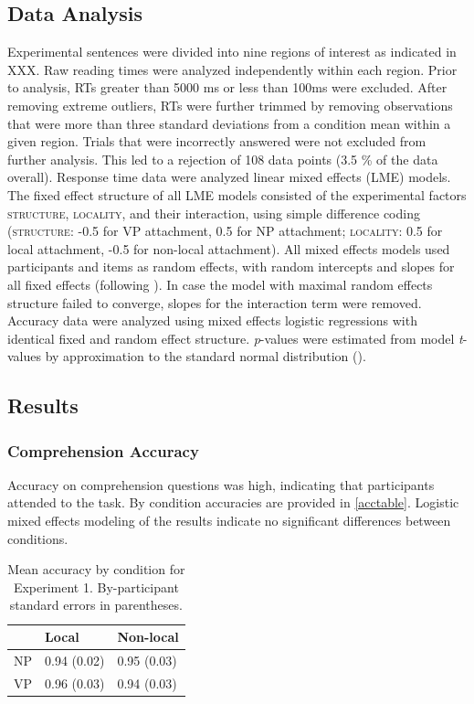 \documentclass[12pt]{article}
\begin{document}
\subsection{Data Analysis}
\label{sec:procedure}

Experimental sentences were divided into nine regions of interest as indicated in XXX. Raw reading times were analyzed independently within each region. Prior to analysis, RTs greater than 5000 ms or less than 100ms were excluded. After removing extreme outliers, RTs were further trimmed by removing observations that were more than three standard deviations from a condition mean within a given region. Trials that were incorrectly answered were not excluded from further analysis. This led to a rejection of 108 data points (3.5 \% of the data overall). Response time data were analyzed linear mixed effects (LME) models. The fixed effect structure of all LME models consisted of the experimental factors \textsc{structure}, \textsc{locality}, and their interaction, using simple difference coding (\textsc{structure}: -0.5 for VP attachment,  0.5 for NP attachment;  \textsc{locality}: 0.5 for local attachment, -0.5 for non-local attachment). All mixed effects models used participants and items as random effects, with random intercepts and slopes for all fixed effects (following \cite{barr2013}). In case the model with maximal random effects structure failed to converge, slopes for the interaction term were removed. Accuracy data were analyzed using mixed effects logistic regressions with identical fixed and random effect structure. \textit{p}-values were estimated from model \textit{t}-values by approximation to the standard normal distribution (\cite{baayen2008}).   
  
\subsection{Results}
\label{sec:results}

\subsubsection{Comprehension Accuracy}
\label{sec:acc}

Accuracy on comprehension questions was high, indicating that participants attended to the task. By condition accuracies are provided in \ref{acctable}. Logistic mixed effects modeling of the results indicate no significant differences between conditions. 

\begin{table}[ht]
\begin{center}
\begin{tabular}{rll}
  \hline
 & Local & Non-local \\ 
  \hline
NP & 0.94 (0.02) & 0.95 (0.03) \\ 
  VP & 0.96 (0.03) & 0.94 (0.03) \\ 
   \hline
\end{tabular}
\caption{Mean accuracy by condition for Experiment 1. By-participant standard errors in parentheses.}
\end{center}
\end{table}
\end{document}
